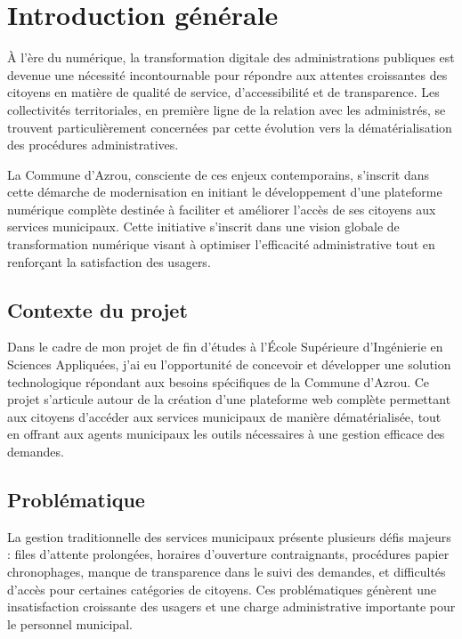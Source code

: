 \chapter*{Introduction générale}

À l'ère du numérique, la transformation digitale des administrations publiques est devenue une nécessité incontournable pour répondre aux attentes croissantes des citoyens en matière de qualité de service, d'accessibilité et de transparence. Les collectivités territoriales, en première ligne de la relation avec les administrés, se trouvent particulièrement concernées par cette évolution vers la dématérialisation des procédures administratives.

La Commune d'Azrou, consciente de ces enjeux contemporains, s'inscrit dans cette démarche de modernisation en initiant le développement d'une plateforme numérique complète destinée à faciliter et améliorer l'accès de ses citoyens aux services municipaux. Cette initiative s'inscrit dans une vision globale de transformation numérique visant à optimiser l'efficacité administrative tout en renforçant la satisfaction des usagers.

\section*{Contexte du projet}

Dans le cadre de mon projet de fin d'études à l'École Supérieure d'Ingénierie en Sciences Appliquées, j'ai eu l'opportunité de concevoir et développer une solution technologique répondant aux besoins spécifiques de la Commune d'Azrou. Ce projet s'articule autour de la création d'une plateforme web complète permettant aux citoyens d'accéder aux services municipaux de manière dématérialisée, tout en offrant aux agents municipaux les outils nécessaires à une gestion efficace des demandes.

\section*{Problématique}

La gestion traditionnelle des services municipaux présente plusieurs défis majeurs : files d'attente prolongées, horaires d'ouverture contraignants, procédures papier chronophages, manque de transparence dans le suivi des demandes, et difficultés d'accès pour certaines catégories de citoyens. Ces problématiques génèrent une insatisfaction croissante des usagers et une charge administrative importante pour le personnel municipal.

